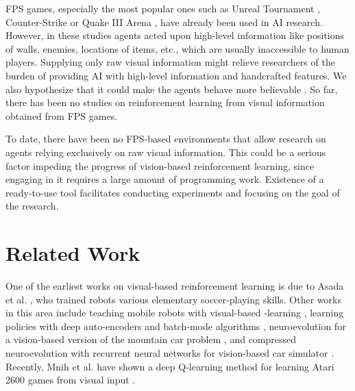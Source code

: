 \documentclass[english,american,conference, balance]{IEEEtran}
\begin{document}
\begin{comment}
Paragraph 4 and 5: 

Why is the problem important?

Why is the problem hard?

At a high level what are the differences in what you are doing, and
what others have done? Keep this at a high level, you can refer to
a future section where specific details and differences will be given.
But it is important for the reader to know at a high level, what is
new about this work compared to other work in the area.
\end{comment}

FPS games, especially the most popular ones such as Unreal Tournament
\cite{6314567,6922494}, Counter-Strike \cite{5035619} or Quake III
Arena \cite{el2007hybrid}, have already been used in AI research.
However, in these studies agents acted upon high-level information
like positions of walls, enemies, locations of items, etc., which
are usually inaccessible to human players. Supplying only raw visual
information might relieve researchers of the burden of providing AI
with high-level information and handcrafted features. We also hypothesize
that it could make the agents behave more believable \cite{karpov:believablebots12}.
So far, there has been no studies on reinforcement learning from visual
information obtained from FPS games.

To date, there have been no FPS-based environments that allow research
on agents relying exclusively on raw visual information. This could
be a serious factor impeding the progress of vision-based reinforcement
learning, since engaging in it requires a large amount of programming
work. Existence of a ready-to-use tool facilitates conducting experiments
and focusing on the goal of the research.


\section{Related Work\label{sec:Related-Work}}

\begin{comment}
Vision-based reinforcement learning
\end{comment}
One of the earliest works on visual-based reinforcement learning is
due to Asada et al. \cite{asada1994vision,asada1996purposive}, who
trained robots various elementary soccer-playing skills. Other works
in this area include teaching mobile robots with visual-based -learning
\cite{gaskett2000reinforcement}, learning policies with deep auto-encoders
and batch-mode algorithms \cite{lange2010deep}, neuroevolution for
a vision-based version of the mountain car problem \cite{cuccu2011intrinsically},
and compressed neuroevolution with recurrent neural networks for vision-based
car simulator \cite{koutnik2014evolving}. Recently, Mnih et al. have
shown a deep Q-learning method for learning Atari 2600 games from
visual input \cite{mnih-dqn-2015}.
\end{document}
